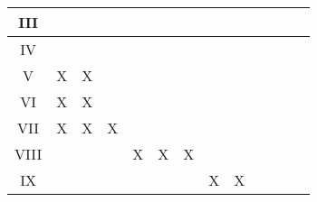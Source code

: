 \begin{quadro}[ht]
\begin{tabular}{|ccccccccccccc|}
\hline
\multicolumn{1}{|c|}{III}       & \multicolumn{1}{c|}{}    & \multicolumn{1}{c|}{}    & \multicolumn{1}{c|}{}    & \multicolumn{1}{c|}{}    & \multicolumn{1}{c|}{}    & \multicolumn{1}{c|}{}    & \multicolumn{1}{c|}{}    & \multicolumn{1}{c|}{}    & \multicolumn{1}{c|}{}    & \multicolumn{1}{c|}{}    & \multicolumn{1}{c|}{}    &   \multicolumn{1}{c|}{}  \\ 
\hline
\multicolumn{1}{|c|}{IV}        & \multicolumn{1}{c|}{}    & \multicolumn{1}{c|}{}    & \multicolumn{1}{c|}{}    & \multicolumn{1}{c|}{}    & \multicolumn{1}{c|}{}    & \multicolumn{1}{c|}{}    & \multicolumn{1}{c|}{}    & \multicolumn{1}{c|}{}    & \multicolumn{1}{c|}{}    & \multicolumn{1}{c|}{}    & \multicolumn{1}{c|}{}    &   \multicolumn{1}{c|}{}  \\ 
\hline
\multicolumn{1}{|c|}{V}         & \multicolumn{1}{c|}{X}    & \multicolumn{1}{c|}{X}    & \multicolumn{1}{c|}{}    & \multicolumn{1}{c|}{}    & \multicolumn{1}{c|}{}    & \multicolumn{1}{c|}{}    & \multicolumn{1}{c|}{}    & \multicolumn{1}{c|}{}    & \multicolumn{1}{c|}{}    & \multicolumn{1}{c|}{}    & \multicolumn{1}{c|}{}    &   \multicolumn{1}{c|}{}  \\ 
\hline
\multicolumn{1}{|c|}{VI}        & \multicolumn{1}{c|}{X}    & \multicolumn{1}{c|}{X}    & \multicolumn{1}{c|}{}    & \multicolumn{1}{c|}{}    & \multicolumn{1}{c|}{}    & \multicolumn{1}{c|}{}    & \multicolumn{1}{c|}{}    & \multicolumn{1}{c|}{}    & \multicolumn{1}{c|}{}    & \multicolumn{1}{c|}{}    & \multicolumn{1}{c|}{}    &   \multicolumn{1}{c|}{}  \\ 
\hline
\multicolumn{1}{|c|}{VII}       & \multicolumn{1}{c|}{X}    & \multicolumn{1}{c|}{X}    & \multicolumn{1}{c|}{X}    & \multicolumn{1}{c|}{}    & \multicolumn{1}{c|}{}    & \multicolumn{1}{c|}{}    & \multicolumn{1}{c|}{}    & \multicolumn{1}{c|}{}    & \multicolumn{1}{c|}{}    & \multicolumn{1}{c|}{}    & \multicolumn{1}{c|}{}    &  \multicolumn{1}{c|}{}   \\ 
\hline
\multicolumn{1}{|c|}{VIII}      & \multicolumn{1}{c|}{}    & \multicolumn{1}{c|}{}    & \multicolumn{1}{c|}{}    & \multicolumn{1}{c|}{X}    & \multicolumn{1}{c|}{X}    & \multicolumn{1}{c|}{X}    & \multicolumn{1}{c|}{}    & \multicolumn{1}{c|}{}    & \multicolumn{1}{c|}{}    & \multicolumn{1}{c|}{}    & \multicolumn{1}{c|}{}    &   \multicolumn{1}{c|}{}  \\ 
\hline
\multicolumn{1}{|c|}{IX}        & \multicolumn{1}{c|}{}    & \multicolumn{1}{c|}{}    & \multicolumn{1}{c|}{}    & \multicolumn{1}{c|}{}    & \multicolumn{1}{c|}{}    & \multicolumn{1}{c|}{}    & \multicolumn{1}{c|}{X}    & \multicolumn{1}{c|}{X}    & \multicolumn{1}{c|}{}    & \multicolumn{1}{c|}{}    & \multicolumn{1}{c|}{}    &  \multicolumn{1}{c|}{}   \\

\end{tabular}
\end{quadro}
